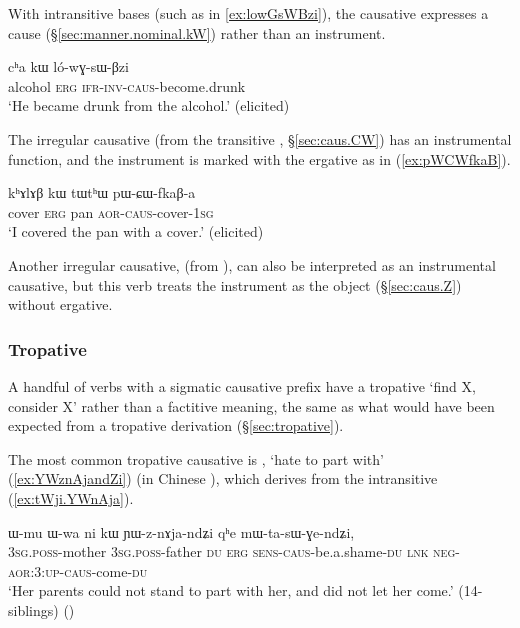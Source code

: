 With intransitive bases (such as  in \ref{ex:lowGsWBzi}), the causative expresses a cause (§\ref{sec:manner.nominal.kW}) rather than an instrument.

\begin{exe}
\ex \label{ex:lowGsWBzi}
\gll cʰa kɯ ló-wɣ-sɯ-βzi \\ 
alcohol \textsc{erg} \textsc{ifr}-\textsc{inv}-\textsc{caus}-become.drunk \\
\glt `He became drunk from the alcohol.' (elicited)
\end{exe}

The irregular causative  (from the transitive , §\ref{sec:caus.CW}) has an instrumental function, and the instrument is marked with the ergative as in (\ref{ex:pWCWfkaB}).

\begin{exe}
\ex \label{ex:pWCWfkaB}
\gll kʰɤlɤβ kɯ tɯtʰɯ pɯ-ɕɯ-fkaβ-a \\
cover \textsc{erg} pan \textsc{aor}-\textsc{caus}-cover-\textsc{1sg} \\
\glt `I covered the pan with a cover.' (elicited)
\end{exe}

Another irregular causative,   (from ), can also be interpreted as an instrumental causative, but this verb treats the instrument as the object (§\ref{sec:caus.Z}) without ergative.

\subsubsection{Tropative} \label{sec:sig.caus.tropative}
A handful of verbs with a sigmatic causative prefix have a tropative `find X, consider X' rather than a factitive meaning,  the same as what would have been expected from a   tropative derivation  (§\ref{sec:tropative}).

The most common tropative causative is  , `hate to part with' (\ref{ex:YWznAjandZi}) (in Chinese ), which derives from the intransitive  (\ref{ex:tWji.YWnAja}). 

\begin{exe}
\ex \label{ex:YWznAjandZi}
\gll ɯ-mu ɯ-wa ni kɯ ɲɯ-z-nɤja-ndʑi qʰe mɯ-ta-sɯ-ɣe-ndʑi, \\
\textsc{3sg}.\textsc{poss}-mother \textsc{3sg}.\textsc{poss}-father \textsc{du} \textsc{erg} \textsc{sens}-\textsc{caus}-be.a.shame-\textsc{du} \textsc{lnk} \textsc{neg}-\textsc{aor}:3\flobv{}:\textsc{up}-\textsc{caus}-come-\textsc{du} \\
\glt `Her parents could not stand to part with her, and did not let her come.' (14-siblings)
()
\end{exe}
 
